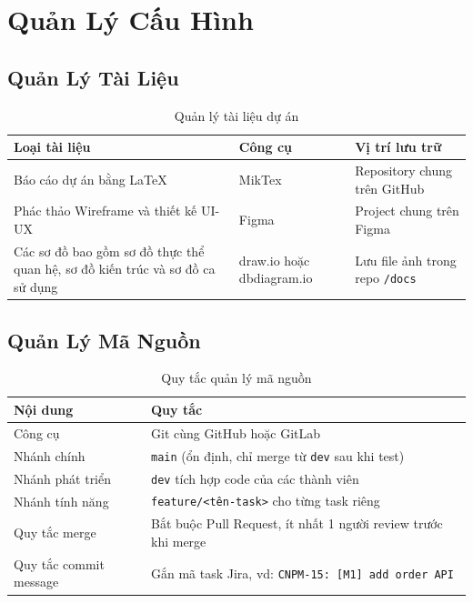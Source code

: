 \section{Quản Lý Cấu Hình}

\subsection{Quản Lý Tài Liệu}

\begin{table}[H]
  \centering
  \begin{tabularx}{\textwidth}{|>{\raggedright\arraybackslash}X|l|>{\raggedright\arraybackslash}X|}
    \hline
    \textbf{Loại tài liệu} & \textbf{Công cụ} & \textbf{Vị trí lưu trữ} \\
    \hline
    Báo cáo dự án bằng LaTeX & MikTex & Repository chung trên GitHub \\ \hline
    Phác thảo Wireframe và thiết kế UI-UX & Figma & Project chung trên Figma \\ \hline
    Các sơ đồ bao gồm sơ đồ thực thể quan hệ, sơ đồ kiến trúc và sơ đồ ca sử dụng & draw.io hoặc dbdiagram.io & Lưu file ảnh trong repo \texttt{/docs} \\
    \hline
  \end{tabularx}
  \caption{Quản lý tài liệu dự án}
  \label{tab:doc_management}
\end{table}

\subsection{Quản Lý Mã Nguồn}

\begin{table}[H]
  \centering
  \begin{tabularx}{\textwidth}{|l|X|}
    \hline
    \textbf{Nội dung} & \textbf{Quy tắc} \\
    \hline
    Công cụ & Git cùng GitHub hoặc GitLab \\ \hline
    Nhánh chính & \texttt{main} (ổn định, chỉ merge từ \texttt{dev} sau khi test) \\ \hline
    Nhánh phát triển & \texttt{dev} tích hợp code của các thành viên \\ \hline
    Nhánh tính năng & \texttt{feature/<tên-task>} cho từng task riêng \\ \hline
    Quy tắc merge & Bắt buộc Pull Request, ít nhất 1 người review trước khi merge \\ \hline
    Quy tắc commit message & Gắn mã task Jira, vd: \texttt{CNPM-15: [M1] add order API} \\
    \hline
  \end{tabularx}
  \caption{Quy tắc quản lý mã nguồn}
  \label{tab:source_management}
\end{table}

